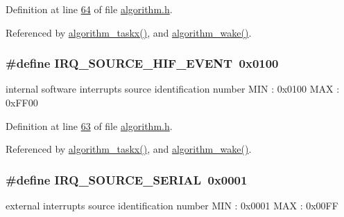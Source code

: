 Definition at line \hyperlink{a00021_source_l00064}{64} of file \hyperlink{a00021_source}{algorithm.\+h}.



Referenced by \hyperlink{a00038_source_l01905}{algorithm\+\_\+taskx()}, and \hyperlink{a00038_source_l00670}{algorithm\+\_\+wake()}.

\hypertarget{a00021_a51725fc3a4c26625f15db1274791d961}{
\subsubsection[{I\+R\+Q\+\_\+\+S\+O\+U\+R\+C\+E\+\_\+\+H\+I\+F\+\_\+\+E\+V\+E\+N\+T}]{\setlength{\rightskip}{0pt plus 5cm}\#define I\+R\+Q\+\_\+\+S\+O\+U\+R\+C\+E\+\_\+\+H\+I\+F\+\_\+\+E\+V\+E\+N\+T~0x0100}}\label{a00021_a51725fc3a4c26625f15db1274791d961}


internal software interrupts source identification number M\+I\+N \+: 0x0100 M\+A\+X \+: 0x\+F\+F00 



Definition at line \hyperlink{a00021_source_l00063}{63} of file \hyperlink{a00021_source}{algorithm.\+h}.



Referenced by \hyperlink{a00038_source_l01905}{algorithm\+\_\+taskx()}, and \hyperlink{a00038_source_l00670}{algorithm\+\_\+wake()}.

\hypertarget{a00021_a286de80383de54438b3e38d9f149dfd0}{
\subsubsection[{I\+R\+Q\+\_\+\+S\+O\+U\+R\+C\+E\+\_\+\+S\+E\+R\+I\+A\+L}]{\setlength{\rightskip}{0pt plus 5cm}\#define I\+R\+Q\+\_\+\+S\+O\+U\+R\+C\+E\+\_\+\+S\+E\+R\+I\+A\+L~0x0001}}\label{a00021_a286de80383de54438b3e38d9f149dfd0}


external interrupts source identification number M\+I\+N \+: 0x0001 M\+A\+X \+: 0x00\+F\+F 



